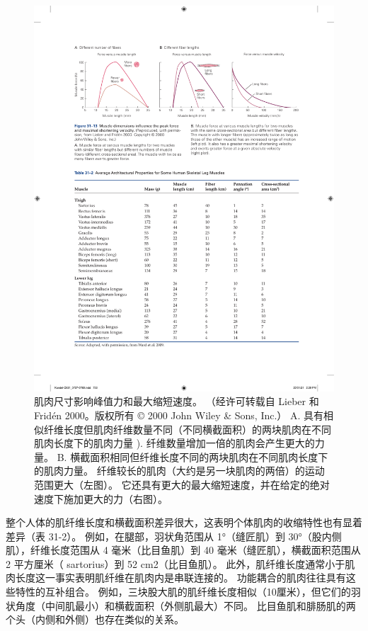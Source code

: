 \begin{figure}[htbp]
	\centering
	\includegraphics[width=0.9\linewidth]{chap31/fig_31_13}
	\caption{肌肉尺寸影响峰值力和最大缩短速度。 （经许可转载自 Lieber 和 Fridén 2000。版权所有 © 2000 John Wiley \& Sons, Inc.） A. 具有相似纤维长度但肌肉纤维数量不同（不同横截面积）的两块肌肉在不同肌肉长度下的肌肉力量 ). 纤维数量增加一倍的肌肉会产生更大的力量。 B. 横截面积相同但纤维长度不同的两块肌肉在不同肌肉长度下的肌肉力量。 纤维较长的肌肉（大约是另一块肌肉的两倍）的运动范围更大（左图）。 它还具有更大的最大缩短速度，并在给定的绝对速度下施加更大的力（右图）。}
	\label{fig:31_13}
\end{figure}

整个人体的肌纤维长度和横截面积差异很大，这表明个体肌肉的收缩特性也有显着差异（表 31-2）。 例如，在腿部，羽状角范围从 1°（缝匠肌）到 30°（股内侧肌），纤维长度范围从 4 毫米（比目鱼肌）到 40 毫米（缝匠肌），横截面积范围从 2 平方厘米（ sartorius）到 52 cm2（比目鱼肌）。 此外，肌纤维长度通常小于肌肉长度这一事实表明肌纤维在肌肉内是串联连接的。 功能耦合的肌肉往往具有这些特性的互补组合。 例如，三块股大肌的肌纤维长度相似（10厘米），但它们的羽状角度（中间肌最小）和横截面积（外侧肌最大）不同。 比目鱼肌和腓肠肌的两个头（内侧和外侧）也存在类似的关系。

